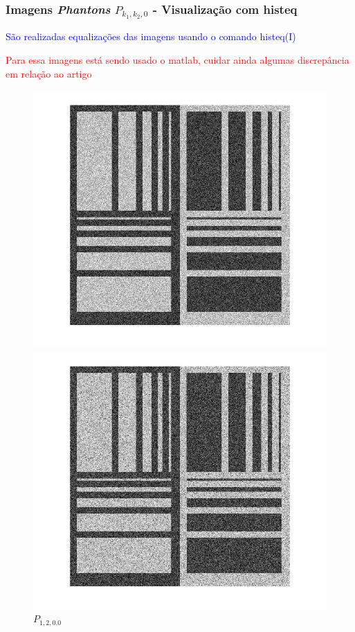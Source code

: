 \documentclass[12pt,a4paper]{article}
\begin{document}
\subsubsection{Imagens  {\it Phantons} $P_{k_1,k_2,0}$ - Visualização com histeq} 


\textcolor{blue}{São realizadas equalizações das imagens usando o comando histeq(I)}

\textcolor{red}{Para essa imagens está sendo usado o matlab, cuidar ainda algumas discrepância em relação ao artigo}

\begin{figure}[!htb]
  \includegraphics[width=\linewidth]{Eq_Phantom_0p000_1_2_1_histeq.jpg}
	\caption{$P_{1,2,0.0}$}\label{fig:awesome_image1}
\endminipage\hfill
{}
  \includegraphics[width=\linewidth]{Eq_Phantom_0p000_1_3_1_histeq.jpg}

\end{figure}
\end{document}
